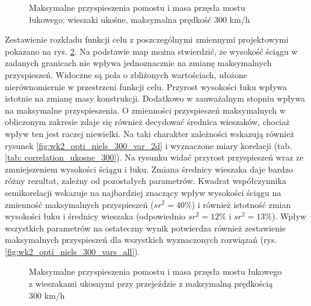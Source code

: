 \begin{figure}[hbt!]
	\centering
	\captionsetup{justification=centering}
	\caption{Maksymalne przyspieszenia pomostu i masa przęsła mostu łukowego: wieszaki ukośne, maksymalna prędkość 300 km/h}
	\label{fig:wk2_opti_niels_300_all}
\end{figure}

Zestawienie rozkładu funkcji celu z poszczególnymi zmiennymi projektowymi pokazano na rys. \ref{fig:wk2_opti_niels_300_variables}. Na podstawie map można stwierdzić, że wysokość ściągu w zadanych granicach nie wpływa jednoznacznie na zmianę maksymalnych przyspieszeń. Widoczne są pola o zbliżonych wartościach, ułożone nierównomiernie w przestrzeni funkcji celu. Przyrost wysokości łuku wpływa istotnie na zmianę masy konstrukcji. Dodatkowo w zauważalnym stopniu wpływa na maksymalne przyspieszenia. O zmienności przyspieszeń maksymalnych w obliczonym zakresie zdaje się również decydować średnica wieszaków, chociaż wpływ ten jest raczej niewielki. Na taki charakter zależności wskazują również rysunek \ref{fig:wk2_opti_niels_300_var_2d} i wyznaczone miary korelacji (tab. \ref{tab: correlation_ukosne_300}). Na rysunku widać przyrost przyspieszeń wraz ze zmniejszeniem wysokości ściągu i łuku. Zmiana średnicy wieszaka daje bardzo różny rezultat, zależny od pozostałych parametrów. Kwadrat współczynnika semikorelacji wskazuje na najbardziej znaczący wpływ wysokości ściągu na zmienność maksymalnych przyspieszeń ($sr^2=40\%$) i również istotność zmian wysokości łuku i średnicy wieszaka (odpowiednio $sr^2 = 12\%$ i $sr^2=13\%$). Wpływ wszystkich parametrów na ostateczny wynik potwierdza również zestawienie maksymalnych przyspieszeń dla wszystkich wyznaczonych rozwiązań (rys. \ref{fig:wk2_opti_niels_300_vars_all}).

\begin{figure}[hbt!]
	\centering
	\captionsetup{justification=centering}
	\caption{Maksymalne przyspieszenia pomostu i masa przęsła mostu łukowego z wieszakami ukosnymi przy przejeździe z maksymalną prędkością 300 km/h}
	\label{fig:wk2_opti_niels_300_variables}
\end{figure}

